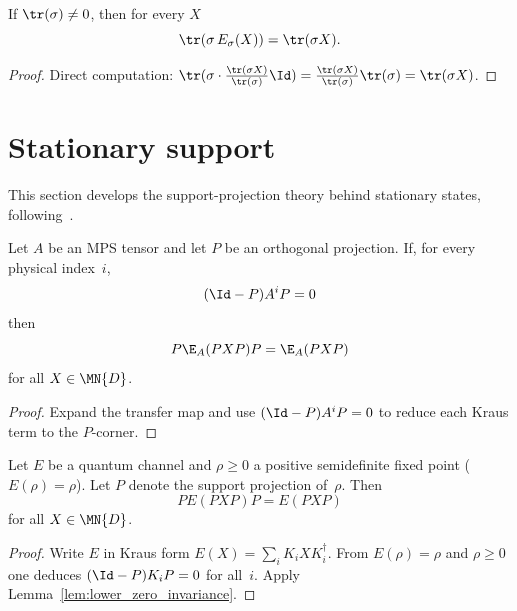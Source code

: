 \begin{lemma}
    \label{thm:scalar_conditional_expectation_preserves_weighted_trace}
    \leanok
    If $\tr(\sigma)\neq 0$, then for every $X$
    \[
        \tr(\sigma\,E_\sigma(X))
        = \tr(\sigma X).
    \]
\end{lemma}
\begin{proof}\leanok
    Direct computation:
    $\tr(\sigma\cdot\tfrac{\tr(\sigma X)}{\tr(\sigma)}\Id)
        = \tfrac{\tr(\sigma X)}{\tr(\sigma)}\tr(\sigma)
        = \tr(\sigma X)$.
\end{proof}

\section{Stationary support}

This section develops the support-projection theory
behind stationary states, following~\cite[Section~6.4, Propositions~6.10--6.11]{Wolf2012Quantum}.

\begin{lemma}%
    \label{lem:lower_zero_invariance}
    \leanok
    Let $A$ be an MPS tensor and let $P$ be an orthogonal projection.
    If, for every physical index~$i$,
    \[
        (\Id - P) A^i P = 0
    \]
    then
    \[
        P \E_A(P X P) P = \E_A(P X P)
    \]
    for all $X \in \MN{D}$.
\end{lemma}

\begin{proof}\leanok
    Expand the transfer map and use $(\Id - P) A^i P = 0$ to reduce
    each Kraus term to the $P$-corner.
\end{proof}

\begin{lemma}%
    \label{thm:support_proj_fixed}
    \leanok
    Let $E$ be a quantum channel and $\rho \ge 0$ a positive
    semidefinite fixed point ($E(\rho) = \rho$).
    Let $P$ denote the support projection of~$\rho$.
    Then
    \[
        P E(P X P) P = E(P X P)
    \]
    for all $X \in \MN{D}$.
\end{lemma}

\begin{proof}
    \leanok
    Write $E$ in Kraus form $E(X) = \sum_i K_i X K_i^\dagger$.
    From $E(\rho) = \rho$ and $\rho \ge 0$ one deduces
    $(\Id - P) K_i P = 0$ for all~$i$.
    Apply Lemma~\ref{lem:lower_zero_invariance}.
\end{proof}

